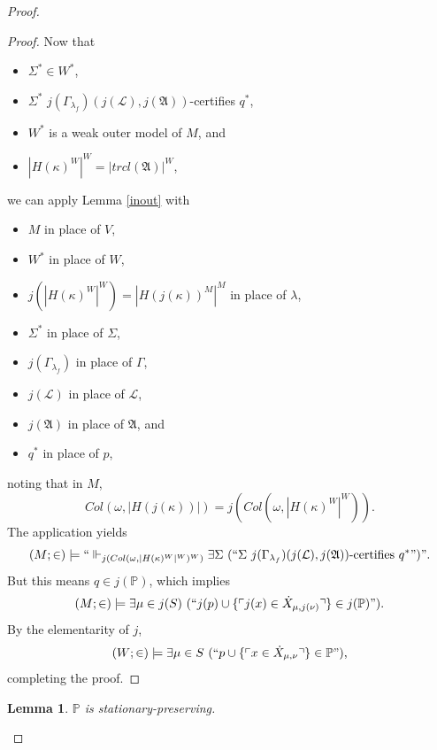 \documentclass[12pt, twoside]{memoir}
\numberwithin{equation}{section}
\newtheorem{lem}[thm]{Lemma}
\theoremstyle{definition}
\theoremstyle{remark}
\theoremstyle{definition}
\theoremstyle{definition}
\theoremstyle{definition}
\theoremstyle{remark}
\begin{document}
\begin{proof}
\begin{proof}
Now that 
\begin{itemize}
    \item $\Sigma^* \in W^*$,
    \item $\Sigma^*$ $j(\Gamma_{\lambda_f})(j(\mathcal{L}), j(\mathfrak{A}))$-certifies $q^*$,
    \item $W^*$ is a weak outer model of $M$, and
    \item $|H(\kappa)^W|^W = |trcl(\mathfrak{A})|^W$,
\end{itemize} 
we can apply Lemma \ref{inout} with 
\begin{itemize}
    \item $M$ in place of $V$,
    \item $W^*$ in place of $W$,
    \item $j(|H(\kappa)^W|^W) = |H(j(\kappa))^M|^M$ in place of $\lambda$,
    \item $\Sigma^*$ in place of $\Sigma$,
    \item $j(\Gamma_{\lambda_f})$ in place of $\Gamma$,
    \item $j(\mathcal{L})$ in place of $\mathcal{L}$,
    \item $j(\mathfrak{A})$ in place of $\mathfrak{A}$, and
    \item $q^*$ in place of $p$,
\end{itemize}
noting that in $M$, $$Col(\omega, |H(j(\kappa))|) = j(Col(\omega, |H(\kappa)^W|^W)).$$ The application yields $$(M; \in) \models ``\Vdash_{j(Col(\omega, |H(\kappa)^W|^W)^W)} \exists \Sigma \ (``\Sigma \ j(\Gamma_{\lambda_f})(j(\mathcal{L}), j(\mathfrak{A})) \text{-certifies } q^*")".$$ But this means $q \in j(\mathbb{P})$, which implies $$(M; \in) \models \exists \mu \in j(S) \ (``j(p) \cup \{\ulcorner j(x) \in \dot{X}_{\mu, j(\nu)} \urcorner\} \in j(\mathbb{P})") \text{.}$$ By the elementarity of $j$, $$(W; \in) \models \exists \mu \in S \ (``p \cup \{\ulcorner x \in \dot{X}_{\mu, \nu} \urcorner\} \in \mathbb{P}") \text{,}$$ completing the proof.
\end{proof}

\begin{lem}\label{statdone}
$\mathbb{P}$ is stationary-preserving.
\end{lem}


\end{proof}
\end{document}
